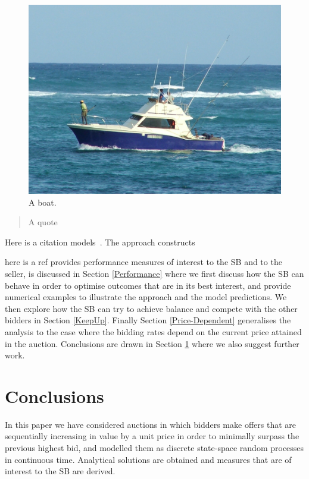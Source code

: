 \documentclass{comjnl}
\begin{document}
\begin{figure}
  \includegraphics[width=\linewidth]{boat.jpg}
  \caption{A boat.}
  \label{fig:boat1}
\end{figure}

\begin{quotation}
A quote
\end{quotation}

Here is a citation models~\cite{gelenbe06}. The approach constructs

here is a ref provides performance measures of interest to the SB and to the
seller, is discussed in Section \ref{Performance} where we first
discuss how the SB can behave in order to optimise outcomes that
are in its best interest, and provide  numerical examples to
illustrate the approach and the model predictions. We then explore
how the SB can try to achieve balance and compete with the other
bidders in Section \ref{KeepUp}. Finally Section
\ref{Price-Dependent} generalises the analysis to the case where
the bidding rates depend on the current price attained in the
auction. Conclusions are drawn in Section \ref{Conclusions} where
we also suggest further work.


\section{Conclusions} \label{Conclusions}
In this paper we have considered auctions in which bidders make
offers that are sequentially increasing in value by a unit price
in order to minimally surpass the previous highest bid, and
modelled them as discrete state-space random processes in
continuous time. Analytical solutions are obtained and measures
that are of interest to the SB are derived.
\end{document}
